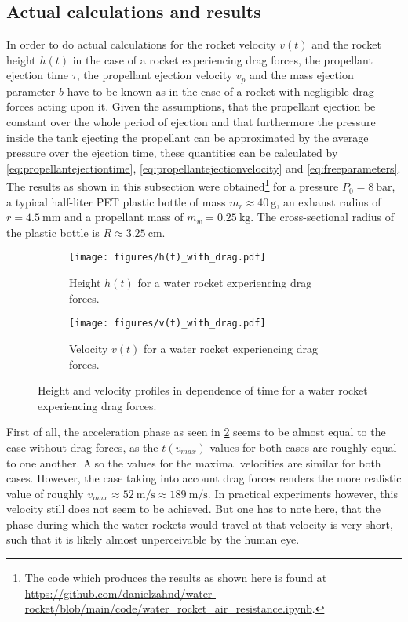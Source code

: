\documentclass[a4paper,11pt]{report}
\begin{document}
\subsection{Actual calculations and results}
In order to do actual calculations for the rocket velocity $v(t)$ and the rocket height $h(t)$ in the case of a rocket experiencing drag forces, the propellant ejection time $\tau$, the propellant ejection  velocity $v_p$ and the mass ejection parameter $b$ have to be known as in the case of a rocket with negligible drag forces acting upon it. Given the assumptions, that the propellant ejection be constant over the whole period of ejection and that furthermore the pressure inside the tank ejecting the propellant can be approximated by the average pressure over the ejection time, these quantities can be calculated by \cref{eq:propellantejectiontime}, \cref{eq:propellantejectionvelocity} and \cref{eq:freeparameters}. The results as shown in this subsection were obtained\footnote{The code which produces the results as shown here is found at \url{https://github.com/danielzahnd/water-rocket/blob/main/code/water_rocket_air_resistance.ipynb}.} for a pressure $P_0 = \SI{8}{\bar}$, a typical half-liter PET plastic bottle of mass $m_r \approx \SI{40}{\gram}$, an exhaust radius of $r = \SI{4.5}{\milli\meter}$ and a propellant mass of $m_w = \SI{0.25}{\kilo\gram}$. The cross-sectional radius of the plastic bottle is $R \approx \SI{3.25}{\centi\meter}$.
\begin{figure}[h]
	\begin{subfigure}{0.49\textwidth}
		\centering
		\texttt{[image: figures/h(t)\_with\_drag.pdf]}
		\caption{Height $h(t)$ for a water rocket experiencing drag forces.}
		\label{fig:h(t)_with_drag}
	\end{subfigure} \hfill
	\begin{subfigure}{0.49\textwidth}
		\centering
		\texttt{[image: figures/v(t)\_with\_drag.pdf]}
		\caption{Velocity $v(t)$ for a water rocket experiencing drag forces.}
		\label{fig:v(t)_with_drag}
	\end{subfigure}
	\caption{Height and velocity profiles in dependence of time for a water rocket experiencing drag forces.}
	\label{fig:results1_with_drag}
\end{figure}

First of all, the acceleration phase as seen in \cref{fig:v(t)_with_drag} seems to be almost equal to the case without drag forces, as the $t(v_{max})$ values for both cases are roughly equal to one another. Also the values for the maximal velocities are similar for both cases. However, the case taking into account drag forces renders the more realistic value of roughly $v_{max} \approx \SI{52}{\meter\per\second} \approx \SI{189}{\meter\per\second}$. In practical experiments however, this velocity still does not seem to be achieved. But one has to note here, that the phase during which the water rockets would travel at that velocity is very short, such that it is likely almost unperceivable by the human eye.
\end{document}
